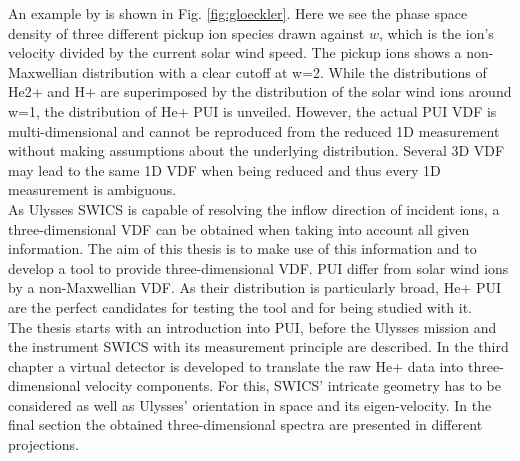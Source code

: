 An example by \citet{gloeckler1999} is shown in Fig. \ref{fig:gloeckler}. Here we see the phase space density of three different pickup ion species drawn against $w$, which is the ion's velocity divided by the current solar wind speed. The pickup ions shows a non-Maxwellian distribution with a clear cutoff at w=2. While the distributions of He2+ and H+ are superimposed by the distribution of the solar wind ions around w=1, the distribution of He+ PUI is unveiled.  
However, the actual PUI VDF is multi-dimensional and cannot be reproduced from the reduced 1D measurement without making assumptions about the underlying distribution.
Several 3D VDF may lead to the same 1D VDF when being reduced and thus every 1D measurement is ambiguous.\\
As Ulysses SWICS is capable of resolving the inflow direction of incident ions, a three-dimensional VDF can be obtained when taking into account all given information.
The aim of this thesis is to make use of this information and to develop a tool to provide three-dimensional VDF. 
PUI differ from solar wind ions by a non-Maxwellian VDF. As their distribution is particularly broad, He+ PUI are the perfect candidates for testing the tool and for being studied with it.
\\
The thesis starts with an introduction into PUI, before the Ulysses mission and the instrument SWICS with its measurement principle are described. In the third chapter a virtual detector is developed to translate the raw He+ data into three-dimensional velocity components. For this, SWICS' intricate geometry has to be considered as well as Ulysses' orientation in space and its eigen-velocity. In the final section the obtained three-dimensional spectra are presented in different projections.